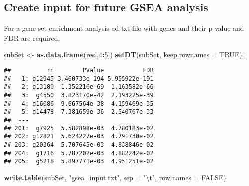 \documentclass[]{article}
\newenvironment{Shaded}{\begin{snugshade}}{\end{snugshade}}
\newcommand{\KeywordTok}[1]{\textcolor[rgb]{0.13,0.29,0.53}{\textbf{#1}}}
\newcommand{\DataTypeTok}[1]{\textcolor[rgb]{0.13,0.29,0.53}{#1}}
\newcommand{\DecValTok}[1]{\textcolor[rgb]{0.00,0.00,0.81}{#1}}
\newcommand{\CharTok}[1]{\textcolor[rgb]{0.31,0.60,0.02}{#1}}
\newcommand{\StringTok}[1]{\textcolor[rgb]{0.31,0.60,0.02}{#1}}
\newcommand{\OtherTok}[1]{\textcolor[rgb]{0.56,0.35,0.01}{#1}}
\newcommand{\OperatorTok}[1]{\textcolor[rgb]{0.81,0.36,0.00}{\textbf{#1}}}
\newcommand{\NormalTok}[1]{#1}
\begin{document}
\subsection{Create input for future GSEA
analysis}\label{create-input-for-future-gsea-analysis}

For a gene set enrichment analysis ad txt file with genes and their
p-value and FDR are required.

\begin{Shaded}
\begin{Highlighting}[]
\NormalTok{subSet <-}\StringTok{ }\KeywordTok{as.data.frame}\NormalTok{(res[,}\DecValTok{4}\OperatorTok{:}\DecValTok{5}\NormalTok{])}
\KeywordTok{setDT}\NormalTok{(subSet, }\DataTypeTok{keep.rownames =} \OtherTok{TRUE}\NormalTok{)[]}
\end{Highlighting}
\end{Shaded}

\begin{verbatim}
##          rn        PValue           FDR
##   1: g12945 3.460733e-194 5.955922e-191
##   2: g13180  1.352216e-69  1.163582e-66
##   3:  g4550  3.823170e-42  2.193225e-39
##   4: g16086  9.667564e-38  4.159469e-35
##   5: g14478  7.381659e-36  2.540767e-33
##  ---                                   
## 201:  g7925  5.582898e-03  4.780183e-02
## 202: g12821  5.624227e-03  4.791730e-02
## 203: g20364  5.707645e-03  4.838846e-02
## 204:  g1716  5.787202e-03  4.882242e-02
## 205:  g5218  5.897771e-03  4.951251e-02
\end{verbatim}

\begin{Shaded}
\begin{Highlighting}[]
\KeywordTok{write.table}\NormalTok{(subSet, }\StringTok{"gsea_input.txt"}\NormalTok{, }\DataTypeTok{sep =} \StringTok{"}\CharTok{\textbackslash{}t}\StringTok{"}\NormalTok{, }\DataTypeTok{row.names =} \OtherTok{FALSE}\NormalTok{)}
\end{Highlighting}
\end{Shaded}
\end{document}
